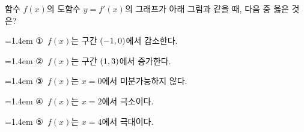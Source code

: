 함수 $f(x)$의 도함수 $y=f'(x)$의 그래프가 아래 그림과 같을 때, 다음 중 옳은 것은?
\par\smallskip\begin{center}\resizebox{\ifdim\width>\linewidth\linewidth\else\width\fi}{!}{}\end{center}
\par\medskip\par\noindent\hangindent=1.4em {\small ①}\ $f(x)$는 구간 $(-1{,}\mkern3mu\mathopen{}0)$에서 감소한다.\par\noindent\hangindent=1.4em {\small ②}\ $f(x)$는 구간 $(1{,}\mkern3mu\mathopen{}3)$에서 증가한다.\par\noindent\hangindent=1.4em {\small ③}\ $f(x)$는 $x=0$에서 미분가능하지 않다.\par\noindent\hangindent=1.4em {\small ④}\ $f(x)$는 $x=2$에서 극소이다.\par\noindent\hangindent=1.4em {\small ⑤}\ $f(x)$는 $x=4$에서 극대이다.\par\medskip
